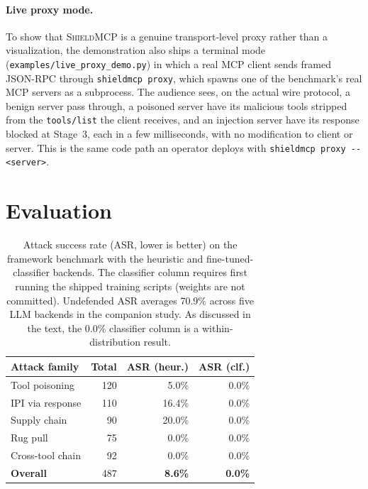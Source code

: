\documentclass[11pt]{article}
\newcommand{\shield}{\textsc{ShieldMCP}}
\begin{document}
\paragraph{Live proxy mode.}
To show that \shield{} is a genuine transport-level proxy rather than a
visualization, the demonstration also ships a terminal mode
(\texttt{examples/live\_proxy\_demo.py}) in which a real MCP client sends framed
JSON-RPC through \texttt{shieldmcp proxy}, which spawns one of the benchmark's real
MCP servers as a subprocess. The audience sees, on the actual wire protocol, a
benign server pass through, a poisoned server have its malicious tools stripped from
the \texttt{tools/list} the client receives, and an injection server have its
response blocked at Stage~3, each in a few milliseconds, with no modification to
client or server. This is the same code path an operator deploys with
\texttt{shieldmcp proxy -{}- <server>}.

\section{Evaluation}
\label{sec:eval}

\begin{table}[t]
\centering
\small
\setlength{\tabcolsep}{4pt}
\begin{tabular}{@{}lrrr@{}}
\toprule
\textbf{Attack family} & \textbf{Total} & \textbf{ASR (heur.)} & \textbf{ASR (clf.)} \\
\midrule
Tool poisoning      & 120 & 5.0\%  & 0.0\% \\
IPI via response    & 110 & 16.4\% & 0.0\% \\
Supply chain        & 90  & 20.0\% & 0.0\% \\
Rug pull            & 75  & 0.0\%  & 0.0\% \\
Cross-tool chain    & 92  & 0.0\%  & 0.0\% \\
\midrule
\textbf{Overall}    & 487 & \textbf{8.6\%} & \textbf{0.0\%} \\
\bottomrule
\end{tabular}
\caption{Attack success rate (ASR, lower is better) on the framework benchmark with
the heuristic and fine-tuned-classifier backends. The classifier column requires
first running the shipped training scripts (weights are not committed). Undefended
ASR averages 70.9\% across five LLM backends in the companion study. As discussed in
the text, the 0.0\% classifier column is a within-distribution result.}
\label{tab:asr}
\end{table}
\end{document}
